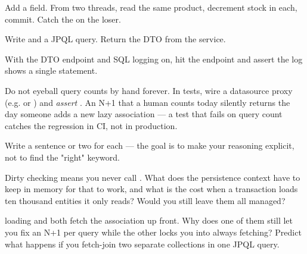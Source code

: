 Add a  field. From two threads, read the same product, decrement stock in each, commit. Catch the  on the loser.

Write  and a JPQL  query. Return the DTO from the service.

With the DTO endpoint and SQL logging on, hit the endpoint and assert the log shows a single statement.

\begin{prodtip}
Do not eyeball query counts by hand forever. In tests, wire a datasource proxy (e.g.  or ) and \emph{assert} . An N+1 that a human counts today silently returns the day someone adds a new lazy association --- a test that fails on query count catches the regression in CI, not in production.
\end{prodtip}


Write a sentence or two for each --- the goal is to make your reasoning explicit, not to find the "right" keyword.

\begin{thinkbox}
Dirty checking means you never call . What does the persistence context have to keep in memory for that to work, and what is the cost when a transaction loads ten thousand entities it only reads? Would you still leave them all managed?
\end{thinkbox}

\begin{thinkbox}
 loading and  both fetch the association up front. Why does one of them still let you fix an N+1 per query while the other locks you into always fetching? Predict what happens if you fetch-join two separate collections in one JPQL query.
\end{thinkbox}

